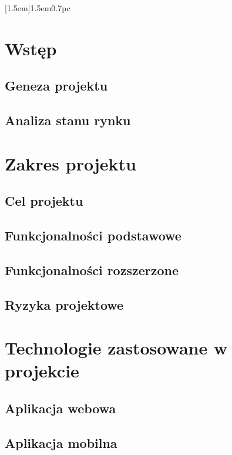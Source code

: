 \documentclass[a4paper,11pt]{article}
\begin{document}
\newpage
\maketitle
\newpage

[1.5em]{\addvspace{1pc}\bfseries}{1.5em}{0.7pc}

\renewcommand\lstlistingname{Listing}
\renewcommand\lstlistlistingname{Spis listingów}

\tableofcontents

\newpage

\makeatother

\section{Wstęp}
\subsection{Geneza projektu}
\subsection{Analiza stanu rynku}
\section{Zakres projektu}
\subsection{Cel projektu}
\subsection{Funkcjonalności podstawowe}
\subsection{Funkcjonalności rozszerzone}
\subsection{Ryzyka projektowe}
\section{Technologie zastosowane w projekcie}
\subsection{Aplikacja webowa}
\subsection{Aplikacja mobilna}
\end{document}
